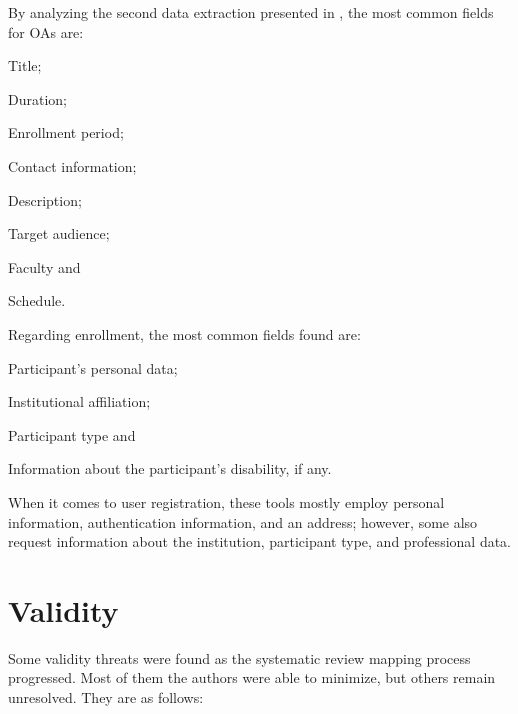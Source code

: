 \begin{itemize}
        By analyzing the second data extraction presented in , the most common fields for \acp{OA} are:
        \begin{inparaenum}[(a)]
          \item Title;
          \item Duration;
          \item Enrollment period;
          \item Contact information;
          \item Description;
          \item Target audience;
          \item Faculty and
          \item Schedule.
        \end{inparaenum}

        Regarding enrollment, the most common fields found are:
        \begin{inparaenum}[(a)]
          \item Participant's personal data;
          \item Institutional affiliation;
          \item Participant type and
          \item Information about the participant's disability, if any.
        \end{inparaenum}

        When it comes to user registration, these tools mostly employ personal information, authentication information, and an address; however, some also request information about the institution, participant type, and professional data.
\end{itemize}

\section{Validity}\label{sec:gl-validity}

Some validity threats were found as the systematic review mapping process progressed. Most of them the authors were able to minimize, but others remain unresolved. They are as follows:

